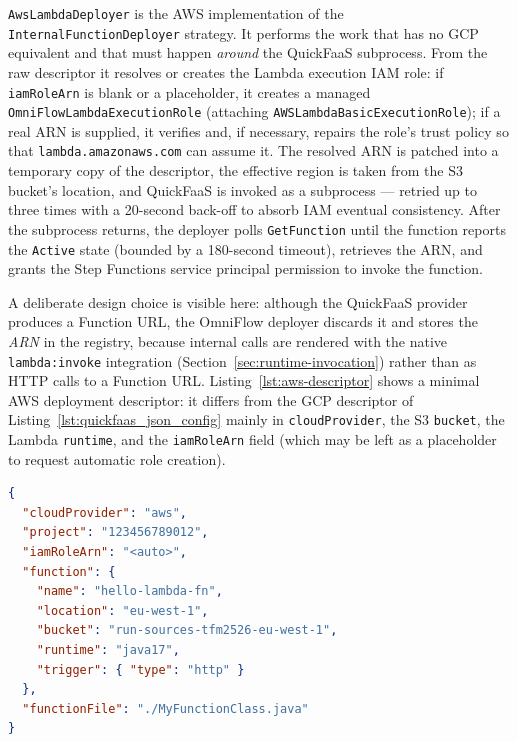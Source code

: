 \texttt{AwsLambdaDeployer} is the AWS implementation of the \texttt{InternalFunctionDeployer}
strategy. It performs the work that has no GCP equivalent and that must happen \emph{around} the
QuickFaaS subprocess. From the raw descriptor it resolves or creates the Lambda execution IAM role:
if \texttt{iamRoleArn} is blank or a placeholder, it creates a managed
\texttt{OmniFlowLambdaExecutionRole} (attaching \texttt{AWSLambdaBasicExecutionRole}); if a real ARN
is supplied, it verifies and, if necessary, repairs the role's trust policy so that
\texttt{lambda.amazonaws.com} can assume it. The resolved ARN is patched into a temporary copy of
the descriptor, the effective region is taken from the S3 bucket's location, and QuickFaaS is
invoked as a subprocess --- retried up to three times with a 20-second back-off to absorb IAM
eventual consistency. After the subprocess returns, the deployer polls \texttt{GetFunction} until
the function reports the \texttt{Active} state (bounded by a 180-second timeout), retrieves the ARN,
and grants the Step Functions service principal permission to invoke the function.

A deliberate design choice is visible here: although the QuickFaaS provider produces a Function URL,
the OmniFlow deployer discards it and stores the \emph{ARN} in the registry, because internal calls
are rendered with the native \texttt{lambda:invoke} integration (Section~\ref{sec:runtime-invocation})
rather than as HTTP calls to a Function URL. Listing~\ref{lst:aws-descriptor} shows a minimal AWS
deployment descriptor: it differs from the GCP descriptor of
Listing~\ref{lst:quickfaas_json_config} mainly in \texttt{cloudProvider}, the S3 \texttt{bucket},
the Lambda \texttt{runtime}, and the \texttt{iamRoleArn} field (which may be left as a placeholder to
request automatic role creation).

\begin{lstlisting}[language=json,caption={Minimal AWS deployment descriptor for an internal function.},label={lst:aws-descriptor}]
{
  "cloudProvider": "aws",
  "project": "123456789012",
  "iamRoleArn": "<auto>",
  "function": {
    "name": "hello-lambda-fn",
    "location": "eu-west-1",
    "bucket": "run-sources-tfm2526-eu-west-1",
    "runtime": "java17",
    "trigger": { "type": "http" }
  },
  "functionFile": "./MyFunctionClass.java"
}
\end{lstlisting}

